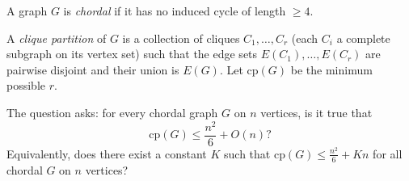 A graph $G$ is \emph{chordal} if it has no induced cycle of length $\ge 4$.

A \emph{clique partition} of $G$ is a collection of cliques $C_1,\dots,C_r$ (each $C_i$ a complete subgraph on its vertex set) such that the edge sets $E(C_1),\dots,E(C_r)$ are pairwise disjoint and their union is $E(G)$.
Let $\mathrm{cp}(G)$ be the minimum possible $r$.

The question asks: for every chordal graph $G$ on $n$ vertices, is it true that
\[
\mathrm{cp}(G) \le \frac{n^2}{6}+O(n)?
\]
Equivalently, does there exist a constant $K$ such that $\mathrm{cp}(G)\le \frac{n^2}{6}+Kn$ for all chordal $G$ on $n$ vertices?
